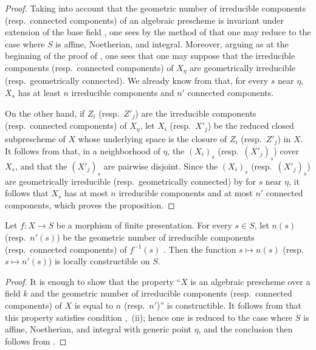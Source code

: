 \begin{proof}
Taking into account that the geometric number of irreducible components (resp.\ connected components) of an algebraic prescheme is invariant under extension of the base field , one sees by the method of  that one may reduce to the case where $S$ is affine, Noetherian, and integral. Moreover, arguing as at the beginning of the proof of , one sees that one may suppose that the irreducible components (resp.\ connected components) of $X_\eta$ are geometrically irreducible (resp.\ geometrically connected). We already know from  that, for every $s$ near $\eta$, $X_s$ has at least $n$ irreducible components and $n'$ connected components.

On the other hand, if $Z_i$ (resp.\ $Z'_j$) are the irreducible components (resp.\ connected components) of $X_\eta$, let $X_i$ (resp.\ $X'_j$) be the reduced closed subprescheme of $X$ whose underlying space is the closure of $Z_i$ (resp.\ $Z'_j$) in $X$. It follows from  that, in a neighborhood of $\eta$, the $(X_i)_s$ (resp.\ $(X'_j)_s$) cover $X_s$, and that the $(X'_j)_s$ are pairwise disjoint. Since the $(X_i)_s$ (resp.\ $(X'_j)_s$) are geometrically irreducible (resp.\ geometrically connected) by  for $s$ near $\eta$, it follows that $X_s$ has at most $n$ irreducible components and at most $n'$ connected components, which proves the proposition.
\end{proof}

\begin{corollary}[9.7.9]
\label{IV.9.7.9}
Let $f:X\to S$ be a morphism of finite presentation. For every $s\in S$, let $n(s)$ (resp.\ $n'(s)$) be the geometric number of irreducible components (resp.\ connected components) of $f^{-1}(s)$ . Then the function $s\mapsto n(s)$ (resp.\ $s\mapsto n'(s)$) is locally constructible on $S$.
\end{corollary}

\begin{proof}
It is enough to show that the property ``$X$ is an algebraic prescheme over a field $k$ and the geometric number of irreducible components (resp.\ connected components) of $X$ is equal to $n$ (resp.\ $n'$)'' is constructible. It follows from  that this property satisfies condition ,~(ii); hence one is reduced to the case where $S$ is affine, Noetherian, and integral with generic point $\eta$, and the conclusion then follows from .
\end{proof}

